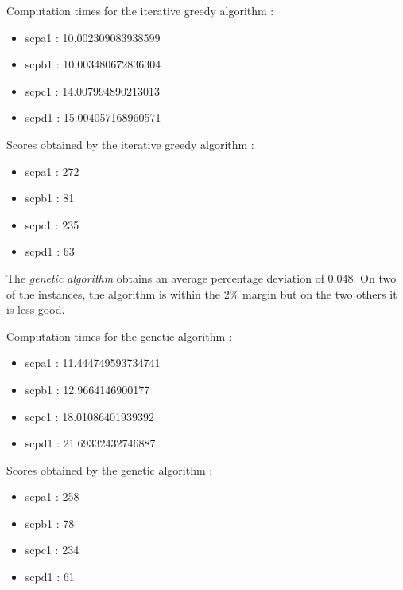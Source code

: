 \documentclass[a4paper,12pt]{article}
\begin{document}
Computation times for the iterative greedy algorithm : 
\begin{itemize}
    \item scpa1 : 10.002309083938599
    \item scpb1 : 10.003480672836304
    \item scpc1 : 14.007994890213013
    \item scpd1 : 15.004057168960571
\end{itemize}

Scores obtained by the iterative greedy algorithm : 

\begin{itemize}
    \item scpa1 : 272
    \item scpb1 : 81
    \item scpc1 : 235
    \item scpd1 : 63
\end{itemize}

The \textit{genetic algorithm} obtains an average percentage deviation of 0.048. On two of the instances, the algorithm is within the 2\% margin but on the two others it is less good.

Computation times for the genetic algorithm : 
\begin{itemize}
    \item scpa1 : 11.444749593734741
    \item scpb1 : 12.9664146900177
    \item scpc1 : 18.01086401939392
    \item scpd1 : 21.69332432746887
\end{itemize}

Scores obtained by the genetic algorithm : 

\begin{itemize}
    \item scpa1 : 258
    \item scpb1 : 78
    \item scpc1 : 234
    \item scpd1 : 61
\end{itemize}



\end{document}
